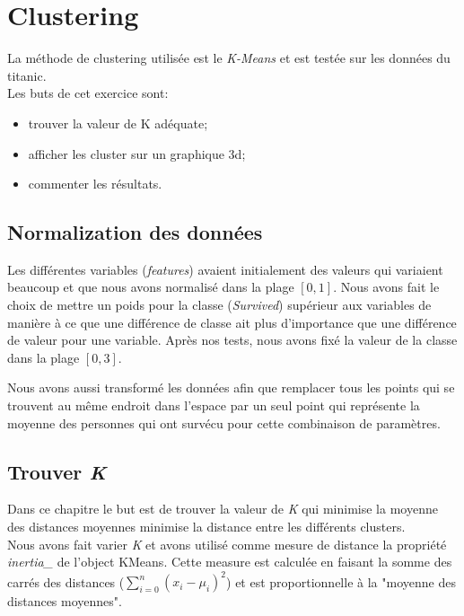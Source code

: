 \documentclass[11pt, a4paper]{article}
\begin{document}
\section{Clustering}

La méthode de clustering utilisée est le \textit{K-Means} et est testée sur les données du titanic. \\

Les buts de cet exercice sont:
\begin{itemize}
    \item trouver la valeur de K adéquate;
    \item afficher les cluster sur un graphique 3d;
    \item commenter les résultats.\\
\end{itemize}

\subsection{Normalization des données}
Les différentes variables (\textit{features}) avaient initialement des valeurs qui variaient
beaucoup et que nous avons normalisé dans la plage $[0, 1]$.
Nous avons fait le choix de mettre un poids pour la classe (\textit{Survived}) supérieur aux variables de manière à ce que
une différence de classe ait plus d'importance que une différence de valeur pour une variable.
Après nos tests, nous avons fixé la valeur de la classe dans la plage $[0, 3]$.

Nous avons aussi transformé les données afin que remplacer tous les points qui se trouvent au même endroit dans l'espace
par un seul point qui représente la moyenne des personnes qui ont survécu pour cette combinaison de paramètres.

\subsection{Trouver \textit{K}}

Dans ce chapitre le but est de trouver la valeur de \textit{K} qui minimise
la moyenne des distances moyennes minimise la distance entre les différents clusters.\\

Nous avons fait varier \textit{K} et avons utilisé comme mesure de distance la propriété \textit{inertia\_} de l'object KMeans.
Cette measure est calculée en faisant la somme des carrés des distances ($\sum_{i=0}^{n}(x_i - \mu_i)^2$)
et est proportionnelle à la "moyenne des distances moyennes".\\
\end{document}
